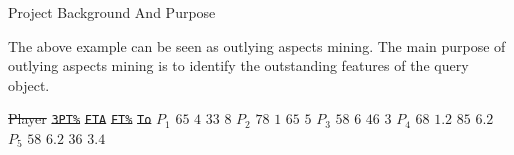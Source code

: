 \documentclass[
 size=14pt,
 paper=smartboard,  %
 mode=present, 		%
 display=slides, 	%
 style=tuliplab,  	%
 pauseslide,
 fleqn,leqno]{powerdot}
\providecommand{\DIFdeltex}[1]{{\protect\color{red}\sout{#1}}}                      %
\providecommand{\DIFdelbegin}{} %
\providecommand{\DIFdel}[1]{\texorpdfstring{\DIFdeltex{#1}}{}} %
\newcommand{\DIFscaledelfig}{0.5}
\newlength{\DIFdelgraphicswidth} %
\newlength{\DIFdelgraphicsheight} %
\newcommand{\DIFdelincludegraphics}[2][]{%
\sbox{\DIFdelgraphicsbox}{\DIFOincludegraphics[#1]{#2}}%
\settoboxwidth{\DIFdelgraphicswidth}{\DIFdelgraphicsbox} %
\settoboxtotalheight{\DIFdelgraphicsheight}{\DIFdelgraphicsbox} %
\scalebox{\DIFscaledelfig}{%
\parbox[b]{\DIFdelgraphicswidth}{\usebox{\DIFdelgraphicsbox}\\[-\baselineskip] \rule{\DIFdelgraphicswidth}{0em}}\llap{\resizebox{\DIFdelgraphicswidth}{\DIFdelgraphicsheight}{%
\setlength{\unitlength}{\DIFdelgraphicswidth}%
\begin{picture}(1,1)%
\thicklines\linethickness{2pt} %
{\color[rgb]{1,0,0}\put(0,0){\framebox(1,1){}}}%
{\color[rgb]{1,0,0}\put(0,0){\line( 1,1){1}}}%
{\color[rgb]{1,0,0}\put(0,1){\line(1,-1){1}}}%
\end{picture}%
}\hspace*{3pt}}} %
} %
\DeclareRobustCommand{\DIFdelbegin}{\DIFOdelbegin \let\includegraphics\DIFdelincludegraphics} %
\begin{document}
\begin{slide}
\begin{slide}{Project Background And Purpose}
\begin{note}
The above example can be seen as outlying aspects mining.
The main purpose of outlying aspects mining is to identify
the outstanding features of the query object.
\end{note}





\DIFdelbegin %
\DIFdel{Player }%
\texttt{\DIFdel{3PT\%}}  %
\texttt{\DIFdel{FTA}} %
\texttt{\DIFdel{FT\%}} %
\texttt{\DIFdel{To}} %
\DIFdel{$P_1$
}%
\DIFdel{$65$}%
\DIFdel{$4$}%
\DIFdel{$33$}%
\DIFdel{$8$}%
\DIFdel{$P_2$
}%
\DIFdel{$78$}%
\DIFdel{$1$}%
\DIFdel{$65$}%
\DIFdel{$5$}%
\DIFdel{$P_3$
}%
\DIFdel{$58$}%
\DIFdel{$6$}%
\DIFdel{$46$}%
\DIFdel{$3$}%
\DIFdel{$P_4$
}%
\DIFdel{$68$}%
\DIFdel{$1.2$}%
\DIFdel{$85$}%
\DIFdel{$6.2$}%
\DIFdel{$P_5$
}%
\DIFdel{$58$}%
\DIFdel{$6.2$}%
\DIFdel{$36$}%
\DIFdel{$3.4$}%


\end{slide}
\end{slide}
\end{document}
